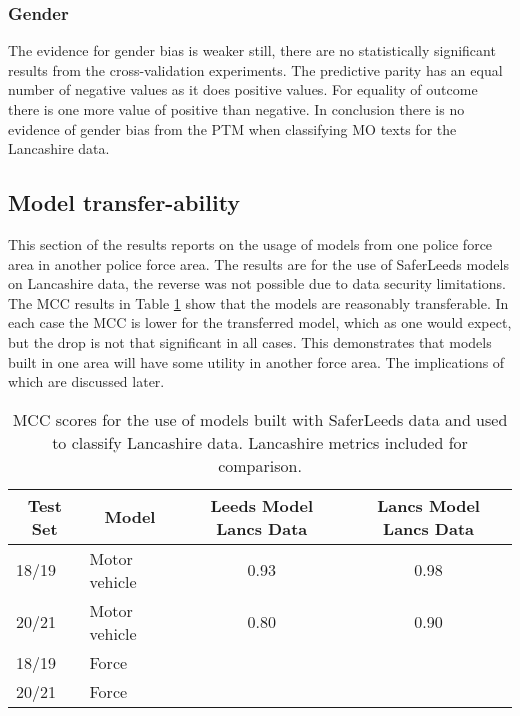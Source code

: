 \subsubsection{Gender} The evidence for gender bias is weaker still, there are no statistically significant results from the cross-validation experiments. The predictive parity has an equal number of negative values as it does positive values. For equality of outcome there is one more value of positive than negative. In conclusion there is no evidence of gender bias from the PTM when classifying MO texts for the Lancashire data.




\subsection{Model transfer-ability} This section of the results reports on the usage of models from one police force area in another police force area. The results are for  the use of SaferLeeds models on Lancashire data, the reverse was not possible due to data security limitations. The MCC results in Table \ref{tab:results_transfer} show that the models are reasonably transferable. In each case the MCC is lower for the transferred model, which as one would expect, but the drop is not that significant in all cases. This demonstrates that models built in one area will have some utility in another force area. The implications of which are discussed later.  


\begin{table}[]
\begin{tabular}{@{}llcc@{}}
\toprule
\multicolumn{1}{c}{Test Set} & \multicolumn{1}{c}{Model} & Leeds Model Lancs Data & Lancs Model Lancs Data \\ \midrule
18/19                        & Motor vehicle             & 0.93                   & 0.98                   \\
20/21                        & Motor vehicle             & 0.80                   & 0.90                   \\
18/19                        & Force                     & \multicolumn{1}{l}{}   & \multicolumn{1}{l}{}   \\
20/21                        & Force                     & \multicolumn{1}{l}{}   & \multicolumn{1}{l}{}   \\ \bottomrule
\end{tabular}
\caption{\label{tab:results_transfer} MCC scores for the use of models built with SaferLeeds data and used to classify Lancashire data. Lancashire metrics included for comparison. }
\end{table}

